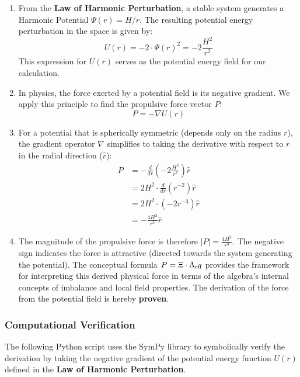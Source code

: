 \begin{enumerate}
    \item From the \textbf{Law of Harmonic Perturbation}, a stable system generates a Harmonic Potential $\Psi(r) = H/r$.  The resulting potential energy perturbation in the space is given by: 
    $$ U(r) = -2 \cdot \Psi(r)^2 = -2\frac{H^2}{r^2} $$
    This expression for $U(r)$ serves as the potential energy field for our calculation.

    \item In physics, the force exerted by a potential field is its negative gradient. We apply this principle to find the propulsive force vector $P$:
    $$ P = -\nabla U(r) $$

    \item For a potential that is spherically symmetric (depends only on the radius $r$), the gradient operator $\nabla$ simplifies to taking the derivative with respect to $r$ in the radial direction ($\hat{r}$):
    \begin{align*}
        P &= - \frac{d}{dr} \left( -2\frac{H^2}{r^2} \right) \hat{r} \\
          &= 2H^2 \cdot \frac{d}{dr} \left( r^{-2} \right) \hat{r} \\
          &= 2H^2 \cdot (-2r^{-3}) \hat{r} \\
          &= -\frac{4H^2}{r^3} \hat{r}
    \end{align*}
    
    \item The magnitude of the propulsive force is therefore $|P| = \frac{4H^2}{r^3}$. The negative sign indicates the force is attractive (directed towards the system generating the potential). The conceptual formula $P = \Xi \cdot \Lambda_{\text{eff}}$ provides the framework for interpreting this derived physical force in terms of the algebra's internal concepts of imbalance and local field properties. The derivation of the force from the potential field is hereby \textbf{proven}.
\end{enumerate}

\subsubsection*{Computational Verification}
The following Python script uses the SymPy library to symbolically verify the derivation by taking the negative gradient of the potential energy function $U(r)$ defined in the \textbf{Law of Harmonic Perturbation}.

